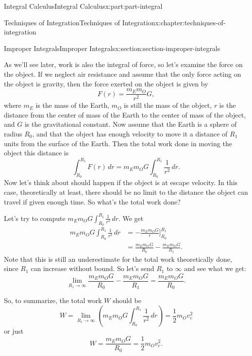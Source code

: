 \documentclass[twoside,10pt,]{book}
\numberwithin{equation}{part}
\begin{document}
\begin{partptx}{Integral Calculus}{}{Integral Calculus}{}{}{x:part:part-integral}
\begin{chapterptx}{Techniques of Integration}{}{Techniques of Integration}{}{}{x:chapter:techniques-of-integration}
\begin{sectionptx}{Improper Integrals}{}{Improper Integrals}{}{}{x:section:section-improper-integrals}
\begin{introduction}{}
\par
As we'll see later, work is also the integral of force, so let's examine the force on the object. If we neglect air resistance and assume that the only force acting on the object is gravity, then the force exerted on the object is given by%
\begin{equation*}
F(r) = \frac{m_{E}m_{O}}{r^{2}}G,
\end{equation*}
where \(m_{E}\) is the mass of the Earth, \(m_{O}\) is still the mass of the object, \(r\) is the distance from the center of mass of the Earth to the center of mass of the object, and \(G\) is the gravitational constant. Now assume that the Earth is a sphere of radius \(R_{0}\), and that the object has enough velocity to move it a distance of \(R_{1}\) units from the surface of the Earth. Then the total work done in moving the object this distance is%
\begin{equation*}
\int_{R_{0}}^{R_{1}}F(r)\,dr = m_{E}m_{O}G\int_{R_{0}}^{R_{1}}\frac{1}{r^{2}}\,dr.
\end{equation*}
Now let's think about should happen if the object is at escape velocity. In this case, theoretically at least, there should be no limit to the distance the object can travel if given enough time. So what's the total work done?%
\par
Let's try to compute \(m_{E}m_{O}G\int_{R_{0}}^{R_{1}}\frac{1}{r^{2}}\,dr.\) We get%
\begin{align*}
m_{E}m_{O}G\int_{R_{0}}^{R_{1}}\frac{1}{r^{2}}\,dr & = -\frac{m_{E}m_{O}G}{r}\big]_{R_{0}}^{R_{1}} \\
& = \frac{m_{E}m_{O}G}{R_{0}} - \frac{m_{E}m_{O}G}{R_{1}}. 
\end{align*}
Note that this is still an underestimate for the total work theoretically done, since \(R_{1}\) can increase without bound. So let's send \(R_{1}\) to \(\infty\) and see what we get:%
\begin{equation*}
\lim_{R_{1}\to\infty}\frac{m_{E}m_{O}G}{R_{0}} - \frac{m_{E}m_{O}G}{R_{1}} = \frac{m_{E}m_{O}G}{R_{0}}.
\end{equation*}
%
\par
So, to summarize, the total work \(W\) should be%
\begin{equation*}
W = \lim_{R_{1}\to\infty}\left(m_{E}m_{O}G\int_{R_{0}}^{R_{1}}\frac{1}{r^{2}}\,dr\right) = \frac{1}{2}m_{O}v_{e}^{2}
\end{equation*}
or just%
\begin{equation*}
W = \frac{m_{E}m_{O}G}{R_{0}} = \frac{1}{2}m_{O}v_{e}^{2}.

\end{equation*}
\end{introduction}
\end{sectionptx}
\end{chapterptx}
\end{partptx}
\end{document}
